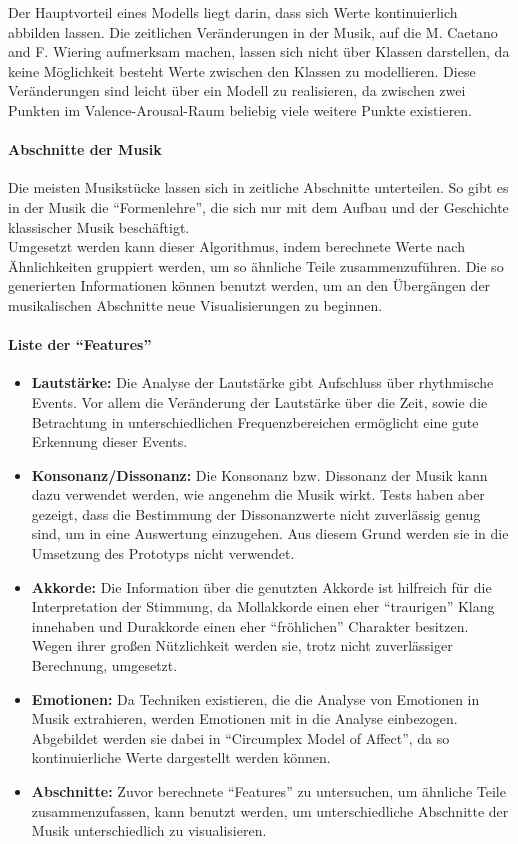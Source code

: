 \documentclass[11pt,a4paper]{article}
\begin{document}
Der Hauptvorteil eines Modells liegt darin, dass sich Werte kontinuierlich abbilden lassen. Die zeitlichen Veränderungen in der Musik, auf die M. Caetano and F. Wiering
 \cite{8a02f9c512933d46fbea928d23ac65e38b61b88caba9b38319a5d4952b5a6667} aufmerksam machen, lassen sich nicht über Klassen darstellen, da keine Möglichkeit besteht Werte zwischen den Klassen zu modellieren. Diese Veränderungen sind leicht über ein Modell zu realisieren, da zwischen zwei Punkten im Valence-Arousal-Raum beliebig viele weitere Punkte existieren.
 
 \paragraph{Abschnitte der Musik}
Die meisten Musikstücke lassen sich in zeitliche Abschnitte unterteilen. So gibt es in der Musik die ``Formenlehre'', die sich nur mit dem Aufbau und der Geschichte klassischer Musik beschäftigt.\\
Umgesetzt werden kann dieser Algorithmus, indem berechnete Werte nach Ähnlichkeiten gruppiert werden, um so ähnliche Teile zusammenzuführen. Die so generierten Informationen können benutzt werden, um an den Übergängen der musikalischen Abschnitte neue Visualisierungen zu beginnen.
 
\paragraph{Liste der ``Features''}
\begin{itemize}
\item \textbf{Lautstärke:}
Die Analyse der Lautstärke gibt Aufschluss über rhythmische Events. Vor allem die Veränderung der Lautstärke über die Zeit, sowie die Betrachtung in unterschiedlichen Frequenzbereichen ermöglicht eine gute Erkennung dieser Events.
\item \textbf{Konsonanz/Dissonanz:}
Die Konsonanz bzw. Dissonanz der Musik kann dazu verwendet werden, wie angenehm die Musik wirkt. Tests haben aber gezeigt, dass die Bestimmung der Dissonanzwerte nicht zuverlässig genug sind, um in eine Auswertung einzugehen. Aus diesem Grund werden sie in die Umsetzung des Prototyps nicht verwendet.
\item \textbf{Akkorde:}
Die Information über die genutzten Akkorde ist hilfreich für die Interpretation der Stimmung, da Mollakkorde einen eher ``traurigen'' Klang innehaben und Durakkorde einen eher ``fröhlichen'' Charakter besitzen. Wegen ihrer großen Nützlichkeit werden sie, trotz nicht zuverlässiger Berechnung, umgesetzt.
\item \textbf{Emotionen:}
Da Techniken existieren, die die Analyse von Emotionen in Musik extrahieren, werden Emotionen mit in die Analyse einbezogen. Abgebildet werden sie dabei in ``Circumplex Model of Affect'', da so kontinuierliche Werte dargestellt werden können.
\item \textbf{Abschnitte:}
Zuvor berechnete ``Features'' zu untersuchen, um ähnliche Teile zusammenzufassen, kann benutzt werden, um unterschiedliche Abschnitte der Musik unterschiedlich zu visualisieren.
\end{itemize}
\end{document}
